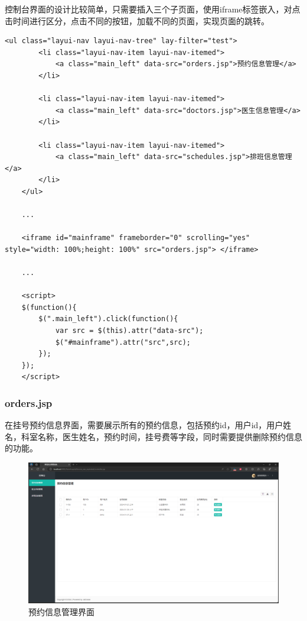 \documentclass[UTF8,12pt]{article}
\begin{document}
控制台界面的设计比较简单，只需要插入三个子页面，使用iframe标签嵌入，对点击时间进行区分，点击不同的按钮，加载不同的页面，实现页面的跳转。

\begin{lstlisting}[frame=shadowbox]
    <ul class="layui-nav layui-nav-tree" lay-filter="test">
        <li class="layui-nav-item layui-nav-itemed">
            <a class="main_left" data-src="orders.jsp">预约信息管理</a>
        </li>

        <li class="layui-nav-item layui-nav-itemed">
            <a class="main_left" data-src="doctors.jsp">医生信息管理</a>
        </li>

        <li class="layui-nav-item layui-nav-itemed">
            <a class="main_left" data-src="schedules.jsp">排班信息管理</a>
        </li>
    </ul>

    ...

    <iframe id="mainframe" frameborder="0" scrolling="yes" style="width: 100%;height: 100%" src="orders.jsp"> </iframe>

    ... 

    <script>
    $(function(){
        $(".main_left").click(function(){
            var src = $(this).attr("data-src");
            $("#mainframe").attr("src",src);
        });
    });
    </script>
\end{lstlisting}

\subsubsection{orders.jsp}
在挂号预约信息界面，需要展示所有的预约信息，包括预约id，用户id，用户姓名，科室名称，医生姓名，预约时间，挂号费等字段，同时需要提供删除预约信息的功能。

\begin{figure}[htbp]
    \centering
    \includegraphics[width=1.0\textwidth]{imgs/18.png}
    \caption{预约信息管理界面}
\end{figure}
\end{document}
